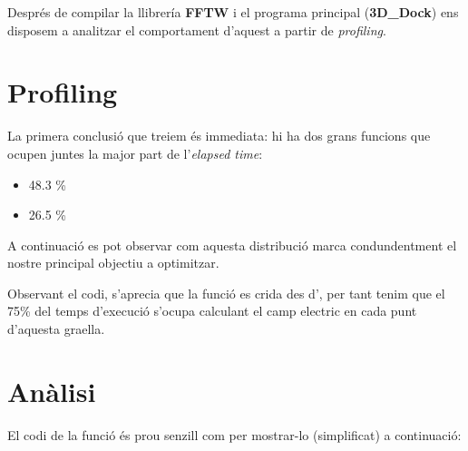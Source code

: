 
Després de compilar la llibrería \textbf{FFTW} i el programa principal (\textbf{3D\_Dock}) ens disposem a analitzar el comportament d'aquest a partir de \emph{profiling}.

\section{Profiling}

La primera conclusió que treiem és immediata: hi ha dos grans funcions que ocupen juntes la major part de l'\emph{elapsed time}:

\begin{itemize}
  \item {} 48.3 \%
  \item {} 26.5 \%
\end{itemize}

A continuació es pot observar com aquesta distribució marca condundentment el nostre principal objectiu a optimitzar.


Observant el codi, s'aprecia que la funció  es crida des d', per tant tenim que el 75\% del temps d'execució s'ocupa calculant el camp electric en cada punt d'aquesta graella.

\section{Anàlisi}

El codi de la funció  és prou senzill com per mostrar-lo (simplificat) a continuació:

